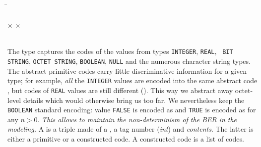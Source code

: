 \vspace*{-10pt}

\begin{tabbing}
\Xtype {} \equal \= \Pint{} \vbar~\Preal{}
\vbar~\Pminusinf{} \vbar~\Pplusinf \vbar~\Pstring{}\\ 
\> \vbar~\Pbitstr{} \vbar~\Pbool{} \Xof {}
\vbar~\Pnull\\
\Xtype {} \equal \lpar{} $\times$
\rpar{} $\times$ \\ 
\Xand {} \equal \Primitive{} \Xof {}
\vbar~\Constructed{} \Xof {} 
\end{tabbing}

\vspace*{-10pt}

The type  captures the codes of the values from
types \texttt{\small INTEGER}, \texttt{\small REAL}, \texttt{\small
  BIT STRING}, \texttt{\small OCTET STRING}, \texttt{\small BOOLEAN},
\texttt{\small NULL} and the numerous character string types. The
abstract primitive codes carry little discriminative information for a
given type; for example, \emph{all} the \texttt{\small INTEGER} values
are encoded into the same abstract code \Pint, but codes of
\texttt{\small REAL} values are still different (\Preal). This way we
abstract away octet-level details which would otherwise bring us too
far. We nevertheless keep the \texttt{\small BOOLEAN} standard
encoding: value \texttt{\small FALSE} is encoded as \lpar{}\rpar{} and \texttt{\small TRUE} is encoded as \lpar{}\rpar{} for any $n>0$. \emph{This allows to maintain the
  non\hyp{}determinism of the BER in the modeling.} A  is a
triple made of a , a tag number (\emph{int}) and
\emph{contents}. The latter is either a primitive or a constructed
code. A constructed code is a list of codes.

\medskip

